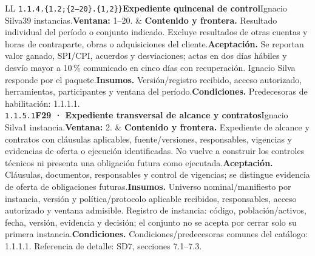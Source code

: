 \begin{longtable}{L{\tabcolsep\relax}L{\tabcolsep\relax}}
\texttt{1.\allowbreak{}1.\allowbreak{}4.\allowbreak{}\{1.\allowbreak{}2;\allowbreak{}\{2--20\}.\allowbreak{}\{1,\allowbreak{}2\}\}}\newline{}\textbf{Expediente quincenal de control}\newline{}Ignacio Silva\newline{}39 instancias.\newline{}\textbf{Ventana:} 1--20. & \textbf{Contenido y frontera.} Resultado individual del período o conjunto indicado. Excluye resultados de otras cuentas y horas de contraparte, obras o adquisiciones del cliente.\newline{}\textbf{Aceptación.} Se reportan valor ganado, SPI/CPI, acuerdos y desviaciones; actas en dos días hábiles y desvío mayor a 10\,\% comunicado en cinco días con recuperación. Ignacio Silva responde por el paquete.\newline{}\textbf{Insumos.} Versión/registro recibido, acceso autorizado, herramientas, participantes y ventana del período.\newline{}\textbf{Condiciones.} Predecesoras de habilitación: 1.1.1.1.\\\hline
\texttt{1.\allowbreak{}1.\allowbreak{}5.\allowbreak{}1}\newline{}\textbf{F29 · Expediente transversal de alcance y contratos}\newline{}Ignacio Silva\newline{}1 instancia.\newline{}\textbf{Ventana:} 2. & \textbf{Contenido y frontera.} Expediente de alcance y contratos con cláusulas aplicables, fuente/versiones, responsables, vigencias y evidencias de oferta o ejecución identificadas. No vuelve a construir los controles técnicos ni presenta una obligación futura como ejecutada.\newline{}\textbf{Aceptación.} Cláusulas, documentos, responsables y control de vigencias; se distingue evidencia de oferta de obligaciones futuras.\newline{}\textbf{Insumos.} Universo nominal/manifiesto por instancia, versión y política/protocolo aplicable recibidos, responsables, acceso autorizado y ventana admisible. Registro de instancia: código, población/activos, fecha, versión, evidencia y decisión; el conjunto no se acepta por cerrar solo su primera instancia.\newline{}\textbf{Condiciones.} Condiciones/predecesoras comunes del catálogo: 1.1.1.1. Referencia de detalle: SD7, secciones 7.1--7.3.\\\hline

\end{longtable}
